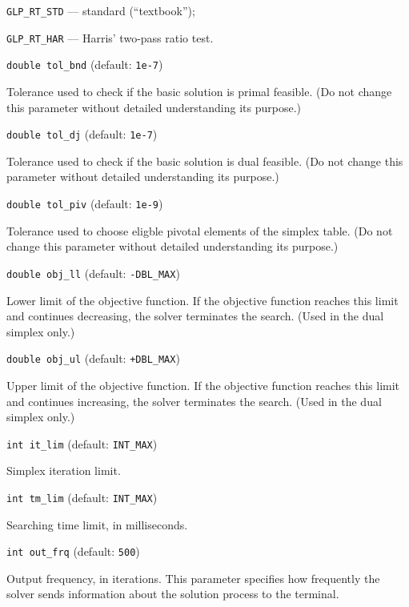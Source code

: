 \verb|GLP_RT_STD| --- standard (``textbook'');

\verb|GLP_RT_HAR| --- Harris' two-pass ratio test.

\bigskip

{\tt double tol\_bnd} (default: {\tt 1e-7})

Tolerance used to check if the basic solution is primal feasible.
(Do not change this parameter without detailed understanding its
purpose.)

\newpage

{\tt double tol\_dj} (default: {\tt 1e-7})

Tolerance used to check if the basic solution is dual feasible.
(Do not change this parameter without detailed understanding its
purpose.)

\bigskip

{\tt double tol\_piv} (default: {\tt 1e-9})

Tolerance used to choose eligble pivotal elements of the simplex table.
(Do not change this parameter without detailed understanding its
purpose.)

\bigskip

{\tt double obj\_ll} (default: {\tt -DBL\_MAX})

Lower limit of the objective function. If the objective function
reaches this limit and continues decreasing, the solver terminates the
search. (Used in the dual simplex only.)

\bigskip

{\tt double obj\_ul} (default: {\tt +DBL\_MAX})

Upper limit of the objective function. If the objective function
reaches this limit and continues increasing, the solver terminates the
search. (Used in the dual simplex only.)

\bigskip

{\tt int it\_lim} (default: {\tt INT\_MAX})

Simplex iteration limit.

\bigskip

{\tt int tm\_lim} (default: {\tt INT\_MAX})

Searching time limit, in milliseconds.

\bigskip

{\tt int out\_frq} (default: {\tt 500})

Output frequency, in iterations. This parameter specifies how
frequently the solver sends information about the solution process to
the terminal.

\bigskip

